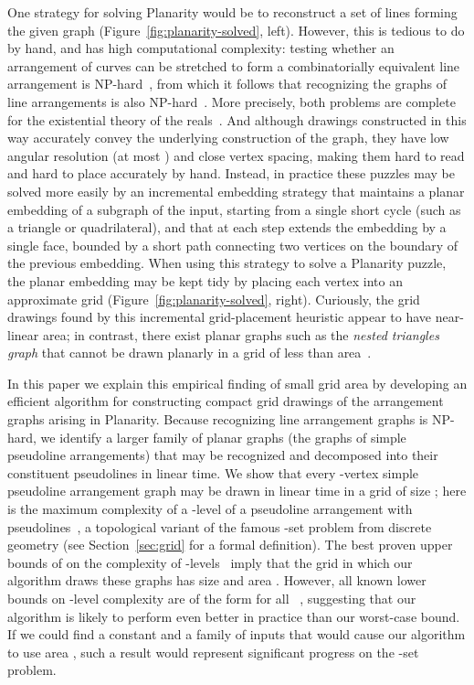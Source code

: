 \documentclass[oribibl]{llncs}
\begin{document}
One strategy for solving Planarity would be to reconstruct a set of lines forming the given graph (Figure~\ref{fig:planarity-solved}, left). However, this is tedious to do by hand, and has high computational complexity: testing whether an arrangement of curves can be stretched to form a combinatorially equivalent line arrangement is NP-hard~\cite{Sho-VKF-91}, from which it follows that recognizing the graphs of line arrangements is also NP-hard~\cite{BosEveWis-IJCGA-03}. More precisely, both problems are complete for the existential theory of the reals~\cite{Sch-GD-09}. And although drawings constructed in this way accurately convey the underlying construction of the graph, they have low angular resolution (at most ) and close vertex spacing, making them hard to read and hard to place accurately by hand.
Instead, in practice these puzzles may be solved more easily by an incremental embedding strategy that maintains a planar embedding of a subgraph of the input, starting from a single short cycle (such as a triangle or quadrilateral), and that at each step extends the embedding by a single face, bounded by a short path connecting two  vertices on the boundary of the previous embedding. When using this strategy to solve a Planarity puzzle, the planar embedding may be kept tidy by placing each vertex into an approximate grid (Figure~\ref{fig:planarity-solved}, right). Curiously, the grid drawings found by this incremental grid-placement heuristic appear to have near-linear area; in contrast, there exist planar graphs such as the \emph{nested triangles graph} that cannot be drawn planarly in a grid of less than  area~\cite{DolLeiTri-ACR-84,Val-TC-81}.

In this paper we explain this empirical finding of small grid area by developing an efficient algorithm for constructing compact grid drawings of the arrangement graphs arising in Planarity. Because recognizing line arrangement graphs is NP-hard, we identify a larger family of planar graphs (the graphs of simple pseudoline arrangements) that may be recognized and decomposed into their constituent pseudolines in linear time.  We show that every -vertex simple pseudoline arrangement graph may be drawn in linear time in a grid of size ; here  is
 the maximum complexity of a -level of a pseudoline arrangement with  pseudolines~\cite{KlaPatPip-82,TamTok-Algo-03,ShaSmo-WADS-03}, a topological variant of the famous -set problem from discrete geometry (see Section~\ref{sec:grid} for a formal definition). The best proven upper bounds of  on the complexity of -levels~\cite{Dey-DCG-98,TamTok-Algo-03,ShaSmo-WADS-03} imply that the grid in which our algorithm draws these graphs has size  and area . However, all known lower bounds on -level complexity are of the form  for all ~\cite{KlaPatPip-82,Tot-DCG-01}, suggesting that our algorithm is likely to perform even better in practice than our worst-case bound. If we could find a constant  and a family of inputs that would cause our algorithm to use area , such a result would represent significant progress on the -set problem.
\end{document}
